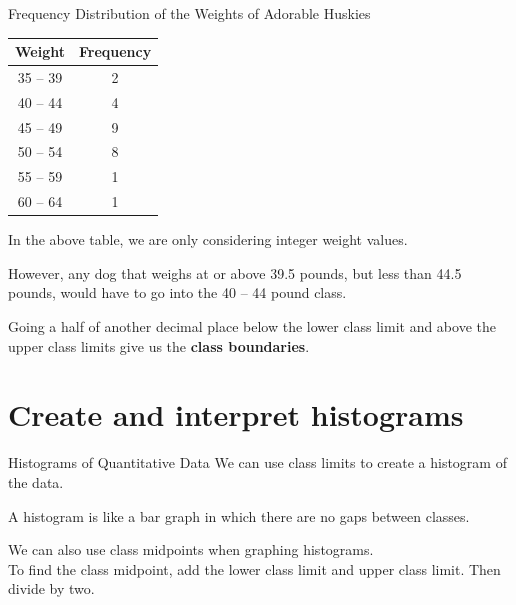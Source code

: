 \documentclass[t]{beamer}
\begin{document}
\begin{frame}{Frequency Distribution of the Weights of Adorable Huskies}
\begin{center}
\begin{tabular}{c|c}
\textbf{Weight} & \textbf{Frequency} \\ \hline
35 -- 39 & 2 \\
40 -- 44 & 4 \\
45 -- 49 & 9 \\
50 -- 54 & 8 \\
55 -- 59 & 1 \\
60 -- 64 & 1 \\
\end{tabular}
\end{center}
\pause
In the above table, we are only considering integer weight values.	\newline\\	\pause

However, any dog that weighs at or above 39.5 pounds, but less than 44.5 pounds, would have to go into the 40 -- 44 pound class. \newline\\	\pause

Going a half of another decimal place below the lower class limit and above the upper class limits give us the {\color{blue}\textbf{class boundaries}}.
\end{frame}

\section{Create and interpret histograms}

\begin{frame}{Histograms of Quantitative Data}
We can use class limits to create a histogram of the data.	\newline\\	\pause

A histogram is like a bar graph in which there are no gaps between classes.		\pause

\begin{center}
\end{center}
\pause We can also use class midpoints when graphing histograms. \pause \newline\\

To find the class midpoint, add the lower class limit and upper class limit. Then divide by two.
\end{frame}
\end{document}
